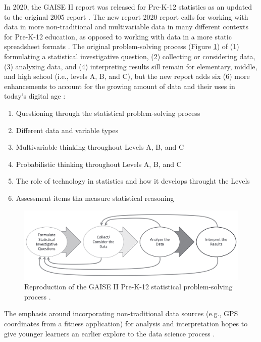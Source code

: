 \documentclass[010-intro.tex]{subfiles}
\begin{document}
    In 2020, the GAISE II report was released for Pre-K-12 statistics as an updated to the original 2005 report
    \cite{gaise2k12}.
    The new report 2020 report calls for working with data in more non-traditional and multivariable data in
    many different contexts for Pre-K-12 education, as opposed to working with data in a more static spreadsheet
    formats
    \cite{gaise2k12}.
    The original problem-solving process (Figure \ref{fig:gaisek-12}) of
    (1) formulating a statistical investigative question,
    (2) collecting or considering data,
    (3) analyzing data, and
    (4) interpreting results
    sill remain for elementary, middle, and high school (i.e., levels A, B, and C),
    but the new report adds six (6) more enhancements to account for the growing amount of
    data and their uses in today's digital age \cite{gaise2k12}:

    \begin{enumerate}
        \item Questioning through the statistical problem-solving process
        \item Different data and variable types
        \item Multivariable thinking throughout Levels A, B, and C
        \item Probabilistic thinking throughout Levels A, B, and C
        \item The role of technology in statistics and how it develops throught the Levels
        \item Assessment items tha measure statistical reasoning
    \end{enumerate}

    \begin{figure}[htb]
        \centering
        \includegraphics[width=\textwidth]{figs/050-intro/gaise2-stat_problem_solving_process.png}
        \caption[GAISE II Pre-K-12 Statistical Proglem-Solving Process]{
        Reproduction of the GAISE II Pre-K-12 statistical problem-solving process \cite{gaise2k12}.
        }
        \label{fig:gaisek-12}
    \end{figure}

    The emphasis around incorporating non-traditional data sources
    (e.g., GPS coordinates from a fitness application)
    for analysis and interpretation
    hopes to give younger learners an earlier explore to the data science process
    \cite{gaise2k12}.
\end{document}
